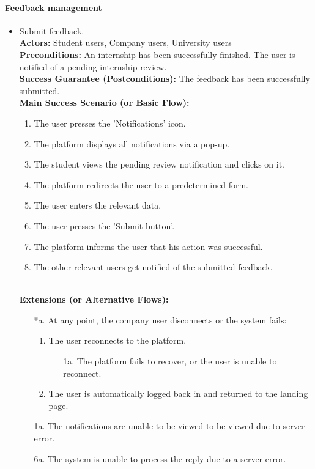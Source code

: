 \paragraph{Feedback management}

\begin{itemize}[label={[\textbf{UC}]}, align=left, leftmargin=*]
    \item {} Submit feedback. \\
    \textbf{Actors:} Student users, Company users, University users\\
     \textbf{Preconditions:} An internship has been successfully finished. The user is notified of a pending internship review.\\
     \textbf{Success Guarantee (Postconditions):} The feedback has been successfully submitted. \\
     \textbf{Main Success Scenario (or Basic Flow):} 
     \begin{enumerate}[label=\arabic*.] 
        \item The user presses the 'Notifications' icon.
        \item The platform displays all notifications via a pop-up.
        \item The student views the pending review notification and clicks on it.
        \item The platform redirects the user to a predetermined form.
        \item The user enters the relevant data.
        \item The user presses the 'Submit button'.
        \item The platform informs the user that his action was successful.
        \item The other relevant users get notified of the submitted feedback.
     \end{enumerate} \\

    \textbf{Extensions (or Alternative Flows):} 
    \begin{enumerate}[label=\arabic*.]
        \item[*a.] At any point, the company user disconnects or the system fails:
            \begin{enumerate}[label=\arabic*.]
                \item The user reconnects to the platform.
                    \begin{enumerate}[label=\alph*.]
                        \item[1a.] The platform fails to recover, or the user is unable to reconnect.
                    \end{enumerate}
                 \item The user is automatically logged back in and returned to the landing page.
            \end{enumerate}
        \item[1a.] The notifications are unable to be viewed to be viewed due to server error.
        \item[6a.] The system is unable to process the reply due to a server error. 
        \end{enumerate}



\end{itemize}
